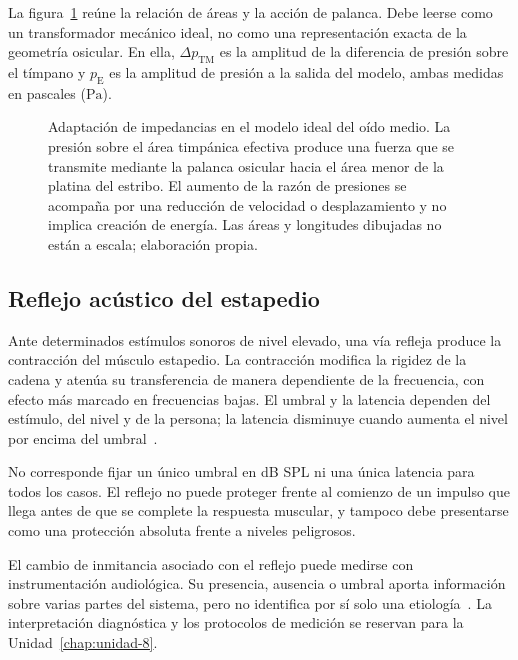 La figura~\ref{fig:u6-adaptacion-oido-medio} reúne la relación de áreas y la
acción de palanca. Debe leerse como un transformador mecánico ideal, no como
una representación exacta de la geometría osicular. En ella,
\(\Delta p_\mathrm{TM}\) es la amplitud de la diferencia de presión sobre el
tímpano y \(p_\mathrm{E}\) es la amplitud de presión a la salida del modelo,
ambas medidas en pascales (\(\text{Pa}\)).

\begin{figure}[htbp]
    \centering
    
    \caption{Adaptación de impedancias en el modelo ideal del oído medio. La
    presión sobre el área timpánica efectiva produce una fuerza que se
    transmite mediante la palanca osicular hacia el área menor de la platina
    del estribo. El aumento de la razón de presiones se acompaña por una
    reducción de velocidad o desplazamiento y no implica creación de energía.
    Las áreas y longitudes dibujadas no están a escala; elaboración propia.}
    \label{fig:u6-adaptacion-oido-medio}
\end{figure}

\subsection{Reflejo acústico del estapedio}
\label{sec:u6-reflejo-estapedial}

Ante determinados estímulos sonoros de nivel elevado, una vía refleja
produce la contracción del músculo estapedio. La contracción modifica la
rigidez de la cadena y atenúa su transferencia de manera dependiente de la
frecuencia, con efecto más marcado en frecuencias bajas. El umbral y la
latencia dependen del estímulo, del nivel y de la persona; la latencia
disminuye cuando aumenta el nivel por encima del umbral~\cite{ashaHearingAdults}.

No corresponde fijar un único umbral en dB SPL ni una única latencia para
todos los casos. El reflejo no puede proteger frente al comienzo de un impulso
que llega antes de que se complete la respuesta muscular, y tampoco debe
presentarse como una protección absoluta frente a niveles peligrosos.

El cambio de inmitancia asociado con el reflejo puede medirse con
instrumentación audiológica. Su presencia, ausencia o umbral aporta
información sobre varias partes del sistema, pero no identifica por sí solo
una etiología~\cite{ashaHearingAdults}. La interpretación diagnóstica y los protocolos de medición se
reservan para la Unidad~\ref{chap:unidad-8}.

